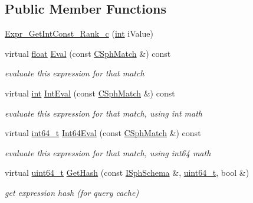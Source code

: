 \subsection*{Public Member Functions}
\begin{DoxyCompactItemize}
\item 
\hyperlink{structExpr__GetIntConst__Rank__c_aab65c1d4c3b6529d6ce303f9117097a7}{Expr\-\_\-\-Get\-Int\-Const\-\_\-\-Rank\-\_\-c} (\hyperlink{sphinxexpr_8cpp_a4a26e8f9cb8b736e0c4cbf4d16de985e}{int} i\-Value)
\item 
virtual \hyperlink{sphinxexpr_8cpp_a0e0d0739f7035f18f949c2db2c6759ec}{float} \hyperlink{structExpr__GetIntConst__Rank__c_a3bd02b7ead2c5833e21562a7576c313e}{Eval} (const \hyperlink{classCSphMatch}{C\-Sph\-Match} \&) const 
\begin{DoxyCompactList}\small\item\em evaluate this expression for that match \end{DoxyCompactList}\item 
virtual \hyperlink{sphinxexpr_8cpp_a4a26e8f9cb8b736e0c4cbf4d16de985e}{int} \hyperlink{structExpr__GetIntConst__Rank__c_a9a7578063041c4f98b44fe7bc127cd72}{Int\-Eval} (const \hyperlink{classCSphMatch}{C\-Sph\-Match} \&) const 
\begin{DoxyCompactList}\small\item\em evaluate this expression for that match, using int math \end{DoxyCompactList}\item 
virtual \hyperlink{sphinxstd_8h_a996e72f71b11a5bb8b3b7b6936b1516d}{int64\-\_\-t} \hyperlink{structExpr__GetIntConst__Rank__c_a96b2338874474a3cfad7d3bf79fc387b}{Int64\-Eval} (const \hyperlink{classCSphMatch}{C\-Sph\-Match} \&) const 
\begin{DoxyCompactList}\small\item\em evaluate this expression for that match, using int64 math \end{DoxyCompactList}\item 
virtual \hyperlink{sphinxstd_8h_aaa5d1cd013383c889537491c3cfd9aad}{uint64\-\_\-t} \hyperlink{structExpr__GetIntConst__Rank__c_ae6ee2a13bf0bfb822b89dde9bea300e2}{Get\-Hash} (const \hyperlink{classISphSchema}{I\-Sph\-Schema} \&, \hyperlink{sphinxstd_8h_aaa5d1cd013383c889537491c3cfd9aad}{uint64\-\_\-t}, bool \&)
\begin{DoxyCompactList}\small\item\em get expression hash (for query cache) \end{DoxyCompactList}\end{DoxyCompactItemize}
